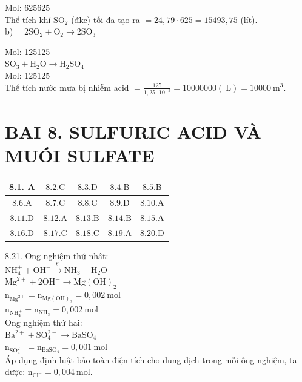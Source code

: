 \documentclass[10pt]{article}
\begin{document}
Mol: 625625\\
Thể tích khí $\mathrm{SO}_{2}$ (đkc) tối đa tạo ra $=24,79 \cdot 625=15493,75$ (lít).\\
b) $\quad 2 \mathrm{SO}_{2}+\mathrm{O}_{2} \longrightarrow 2 \mathrm{SO}_{3}$

Mol: 125125\\
$\mathrm{SO}_{3}+\mathrm{H}_{2} \mathrm{O} \longrightarrow \mathrm{H}_{2} \mathrm{SO}_{4}$\\
Mol: 125125\\
Thể tích nước mưa bị nhiễm acid $=\frac{125}{1,25 \cdot 10^{-5}}=10000000(\mathrm{~L})=10000 \mathrm{~m}^{3}$.

\section*{BAI 8. SULFURIC ACID VÀ MUÓI SULFATE}
\begin{center}
\begin{tabular}{|c|c|c|c|c|}
\hline
8.1. A & $8.2 . \mathrm{C}$ & $8.3 . \mathrm{D}$ & $8.4 . \mathrm{B}$ & $8.5 . \mathrm{B}$ \\
\hline
$8.6 . \mathrm{A}$ & $8.7 . \mathrm{C}$ & $8.8 . \mathrm{C}$ & $8.9 . \mathrm{D}$ & $8.10 . \mathrm{A}$ \\
\hline
$8.11 . \mathrm{D}$ & $8.12 . \mathrm{A}$ & $8.13 . \mathrm{B}$ & $8.14 . \mathrm{B}$ & $8.15 . \mathrm{A}$ \\
\hline
$8.16 . \mathrm{D}$ & $8.17 . \mathrm{C}$ & $8.18 . \mathrm{C}$ & $8.19 . \mathrm{A}$ & $8.20 . \mathrm{D}$ \\
\hline
\end{tabular}
\end{center}

8.21. Ong nghiệm thứ nhât:\\
$\mathrm{NH}_{4}^{+}+\mathrm{OH}^{-} \xrightarrow{t^{\circ}} \mathrm{NH}_{3}+\mathrm{H}_{2} \mathrm{O}$\\
$\mathrm{Mg}^{2+}+2 \mathrm{OH}^{-} \longrightarrow \mathrm{Mg}(\mathrm{OH})_{2}$\\
$\mathrm{n}_{\mathrm{Mg}^{2+}}=\mathrm{n}_{\mathrm{Mg}(\mathrm{OH})_{2}}=0,002 \mathrm{~mol}$\\
$\mathrm{n}_{\mathrm{NH}_{4}^{+}}=\mathrm{n}_{\mathrm{NH}_{3}}=0,002 \mathrm{~mol}$\\
Ong nghiệm thứ hai:\\
$\mathrm{Ba}^{2+}+\mathrm{SO}_{4}^{2-} \longrightarrow \mathrm{BaSO}_{4}$\\
$\mathrm{n}_{\mathrm{SO}_{4}^{2-}}=\mathrm{n}_{\mathrm{BaSO}_{4}}=0,001 \mathrm{~mol}$\\
Áp dụng định luật bảo toàn điện tích cho dung dịch trong mỗi ống nghiệm, ta được: $\mathrm{n}_{\mathrm{Cl}^{-}}=0,004 \mathrm{~mol}$.
\end{document}
